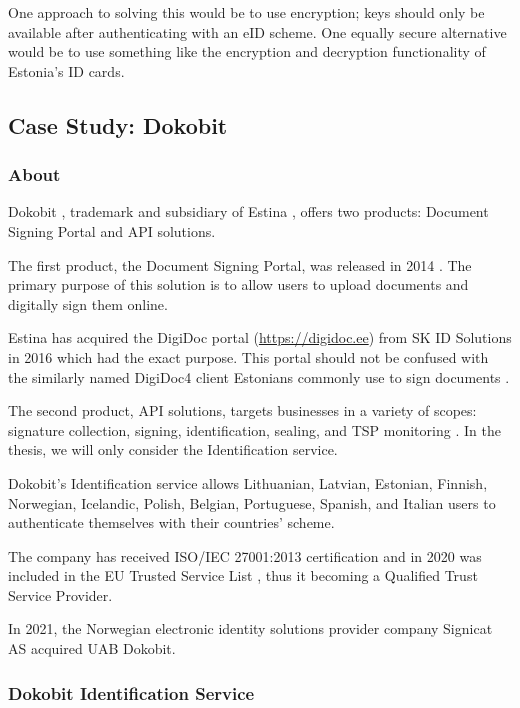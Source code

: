 One approach to solving this would be to use encryption; keys should only be available after authenticating with an eID scheme. One equally secure alternative would be to use something like the encryption and decryption functionality of Estonia's ID cards.

\subsection{Case Study: Dokobit}

\subsubsection{About}

Dokobit \cite{dokobit}, trademark and subsidiary of Estina \cite{euipo-dokobit}, offers two products: Document Signing Portal and API solutions.

The first product, the Document Signing Portal, was released in 2014 \cite{dokobit-aboutus}. The primary purpose of this solution is to allow users to upload documents and digitally sign them online.

Estina has acquired the DigiDoc portal (\url{https://digidoc.ee}) from SK ID Solutions in 2016 \cite{sk-digidocacquired} which had the exact purpose. This portal should not be confused with the similarly named DigiDoc4 client Estonians commonly use to sign documents \cite{ria-idee}.

The second product, API solutions, targets businesses in a variety of scopes: signature collection, signing, identification, sealing, and TSP monitoring \cite{dokobit}. In the thesis, we will only consider the Identification service.

Dokobit's Identification service allows Lithuanian, Latvian, Estonian, Finnish, Norwegian, Icelandic, Polish, Belgian, Portuguese, Spanish, and Italian \cite{dokobit} users to authenticate themselves with their countries' scheme.

The company has received ISO/IEC 27001:2013 certification \cite{dokobit-certification} and in 2020 was included in the EU Trusted Service List \cite{eu-trustservices, dokobit-aboutus}, thus it becoming a Qualified Trust Service Provider.

In 2021, the Norwegian electronic identity solutions provider company Signicat AS acquired UAB Dokobit.

\subsubsection{Dokobit Identification Service}

